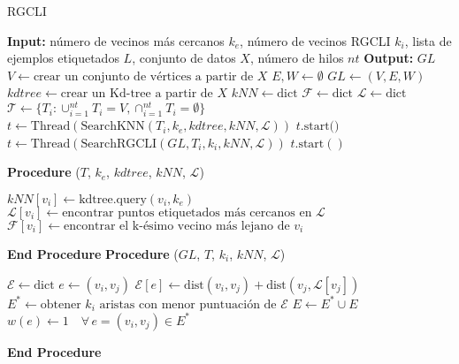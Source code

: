 \begin{algorithm}[h]
\label{rgcli}
    \caption{RGCLI}
    \begin{algorithmic}[1]
        \STATE \textbf{Input:} número de vecinos más cercanos $k_e$, número de vecinos RGCLI $k_i$, lista de ejemplos etiquetados $L$, conjunto de datos $X$, número de hilos $nt$
        \STATE \textbf{Output:} $GL$
        \STATE $V \leftarrow \text{crear un conjunto de vértices a partir de } X$
        \STATE $E, W \leftarrow \emptyset$
        \STATE $GL \leftarrow (V, E, W)$
        \STATE $kdtree \leftarrow \text{crear un Kd-tree a partir de } X$
        \STATE $kNN \leftarrow \text{dict}$
        \STATE $\mathcal{F} \leftarrow \text{dict}$
        \STATE $\mathcal{L} \leftarrow \text{dict}$
        \STATE $\mathcal{T} \leftarrow \{T_i : \cup_{i=1}^{nt} T_i = V, \cap_{i=1}^{nt} T_i = \emptyset \}$
            \STATE $t \leftarrow \text{Thread}(\text{SearchKNN}(T_i, k_e, kdtree, kNN, \mathcal{L}))$
            \STATE $t.\text{start()}$
        \ENDFOR
            \STATE $t \leftarrow \text{Thread}(\text{SearchRGCLI}(GL, T_i, k_i, kNN, \mathcal{L}))$
            \STATE $t.\text{start}()$
        \ENDFOR
        
        \STATE \textbf{Procedure} ($T$, $k_e$, $kdtree$, $kNN$, $\mathcal{L}$)
        \begin{ALC@g}
            \STATE $kNN[v_i] \leftarrow \text{kdtree.query}(v_i, k_e)$
            \STATE $\mathcal{L}[v_i] \leftarrow \text{encontrar puntos etiquetados más cercanos en } \mathcal{L}$
            \STATE $\mathcal{F}[v_i] \leftarrow \text{encontrar el k-ésimo vecino más lejano de } v_i$
        \ENDFOR
        \end{ALC@g}
        \STATE \textbf{End Procedure}
        \STATE \textbf{Procedure} ($GL$, $T$, $k_i$, $kNN$, $\mathcal{L}$)
        \begin{ALC@g}
            \STATE $\mathcal{E} \leftarrow \text{dict}$
                    \STATE $e \leftarrow (v_i, v_j)$
                    \STATE $\mathcal{E}[e] \leftarrow \text{dist}(v_i, v_j) + \text{dist}(v_j, \mathcal{L}[v_j])$
                \ENDIF
            \ENDFOR
            \STATE $E^* \leftarrow \text{obtener } k_i \text{ aristas con menor puntuación de } \mathcal{E}$
            \STATE $E \leftarrow E^* \cup E$
            \STATE $w(e) \leftarrow 1 \quad \forall \, e = (v_i, v_j) \in E^*$
        \ENDFOR
        \end{ALC@g}
        \STATE \textbf{End Procedure}
    \end{algorithmic}
\end{algorithm}